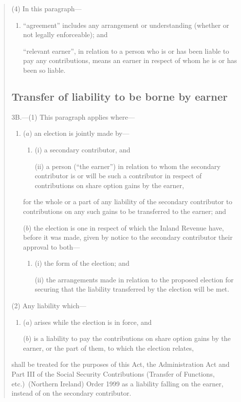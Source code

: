 \documentclass[12pt,a4paper]{article}
\begin{document}
\begin{quotation}
(4) In this paragraph—
\begin{enumerate}\item[]
    “agreement” includes any arrangement or understanding (whether or not legally enforceable); and

    “relevant earner”, in relation to a person who is or has been liable to pay any contributions, means an earner in respect of whom he is or has been so liable. 
\end{enumerate}

\subsection*{Transfer of liability to be borne by earner}

3B.---(1) This paragraph applies where—
\begin{enumerate}\item[]
($a$) an election is jointly made by—
\begin{enumerate}\item[]
(i) a secondary contributor, and

(ii) a person (“the earner”) in relation to whom the secondary contributor is or will be such a contributor in respect of contributions on share option gains by the earner,
\end{enumerate}
for the whole or a part of any liability of the secondary contributor to contributions on any such gains to be transferred to the earner; and

($b$) the election is one in respect of which the Inland Revenue have, before it was made, given by notice to the secondary contributor their approval to both—
\begin{enumerate}\item[]
(i) the form of the election; and

(ii) the arrangements made in relation to the proposed election for securing that the liability transferred by the election will be met.
\end{enumerate}
\end{enumerate}

(2) Any liability which—
\begin{enumerate}\item[]
($a$) arises while the election is in force, and

($b$) is a liability to pay the contributions on share option gains by the earner, or the part of them, to which the election relates,
\end{enumerate}
shall be treated for the purposes of this Act, the Administration Act and Part III of the Social Security Contributions (Transfer of Functions, etc.)\ (Northern Ireland) Order 1999 as a liability falling on the earner, instead of on the secondary contributor.


\end{quotation}
\end{document}

